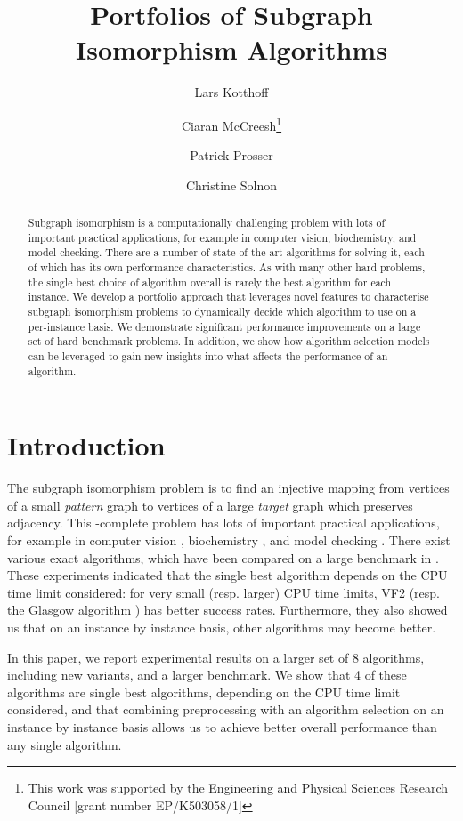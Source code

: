 \documentclass{llncs}
\title{Portfolios of Subgraph Isomorphism Algorithms}
\author{
    Lars Kotthoff\inst{1}
    \and Ciaran McCreesh\thanks{This work was supported by the Engineering
        and Physical Sciences Research Council [grant number EP/K503058/1]}\inst{2}
    \and Patrick Prosser\inst{2}
    \and Christine Solnon\inst{3}}
\institute{
    University of British Columbia, Vancouver, Canada
    \and University of Glasgow, Glasgow, Scotland
    \and INSA-Lyon, LIRIS, UMR5205, F-69621, France}
\begin{document}
\maketitle

\begin{abstract}
Subgraph isomorphism is a computationally challenging problem with lots of important practical
applications, for example in computer vision, biochemistry, and model checking. There are a number
of state-of-the-art algorithms for solving it, each of which has its own performance
characteristics. As with many other hard problems, the single best choice of algorithm overall is
rarely the best algorithm for each instance. We develop a portfolio approach that leverages novel
features to characterise subgraph isomorphism problems to dynamically decide which algorithm to use
on a per-instance basis. We demonstrate significant performance improvements on a large set of hard
benchmark problems. In addition, we show how algorithm selection models can be leveraged to gain new
insights into what affects the performance of an algorithm.
\end{abstract}

\section{Introduction}

The subgraph isomorphism problem is to find an injective mapping from vertices of a small
\emph{pattern} graph to vertices of a large \emph{target} graph which preserves adjacency. This
\NP-complete problem has lots of important practical applications, for example in computer vision
\cite{cviu11,pr15}, biochemistry \cite{Giugno:2013}, and model checking \cite{Sevegnani:2015}. There
exist various exact algorithms, which have been compared on a large benchmark in
\cite{McCreesh:2015}. These experiments indicated that the single best algorithm depends on the CPU
time limit considered: for very small (resp. larger) CPU time limits, VF2 \cite{Cordella:2004}
(resp. the Glasgow algorithm \cite{McCreesh:2015}) has better success rates. Furthermore, they also
showed us that on an instance by instance basis, other algorithms may become better.

In this paper, we report experimental results on a larger set of 8 algorithms, including new
variants, and a larger benchmark. We show that 4 of these algorithms are single best algorithms,
depending on the CPU time limit considered, and that combining preprocessing with an algorithm
selection on an instance by instance basis allows us to achieve better overall performance than any
single algorithm.
\end{document}
